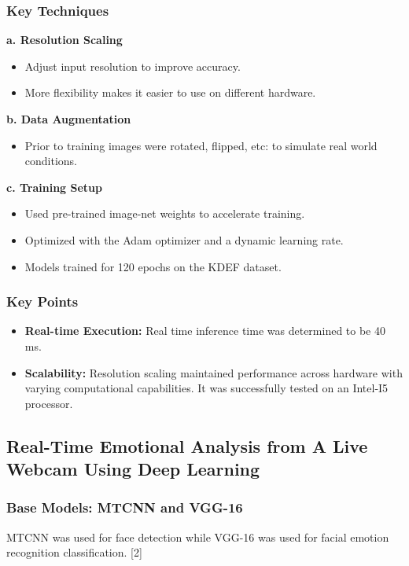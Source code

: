 \documentclass{article}
\begin{document}
\subsubsection*{Key Techniques}
\textbf{a. Resolution Scaling}
\begin{itemize}
    \item Adjust input resolution to improve accuracy.
    \item More flexibility makes it easier to use on different hardware.
\end{itemize}

\textbf{b. Data Augmentation}
\begin{itemize}
    \item Prior to training images were rotated, flipped, etc: to simulate real world conditions.
\end{itemize}

\textbf{c. Training Setup}
\begin{itemize}
    \item Used pre-trained image-net weights to accelerate training.
    \item Optimized with the Adam optimizer and a dynamic learning rate.
    \item Models trained for 120 epochs on the KDEF dataset.
\end{itemize}

\subsubsection*{Key Points}
\begin{itemize}
    \item \textbf{Real-time Execution:} Real time inference time was determined to be 40 ms.
    \item \textbf{Scalability:} Resolution scaling maintained performance across hardware with varying computational capabilities. It was successfully tested on an Intel-I5 processor.
\end{itemize}


\subsection*{Real-Time Emotional Analysis from A Live Webcam Using Deep Learning}

\subsubsection*{Base Models: MTCNN and VGG-16}
MTCNN was used for face detection while VGG-16 was used for facial emotion recognition classification. [2]
\end{document}
